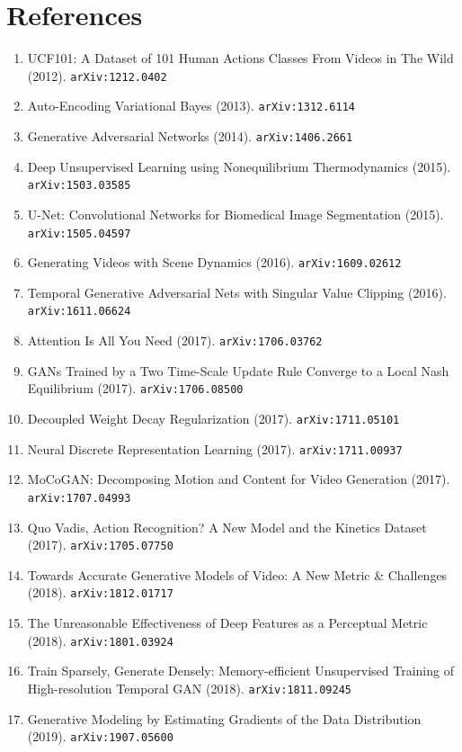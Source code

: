 \documentclass[11pt]{article}
\begin{document}
\section*{References}
\begin{enumerate}\small
  \item UCF101: A Dataset of 101 Human Actions Classes From Videos in The Wild (2012). \texttt{arXiv:1212.0402}
  \item Auto-Encoding Variational Bayes (2013). \texttt{arXiv:1312.6114}
  \item Generative Adversarial Networks (2014). \texttt{arXiv:1406.2661}
  \item Deep Unsupervised Learning using Nonequilibrium Thermodynamics (2015). \texttt{arXiv:1503.03585}
  \item U-Net: Convolutional Networks for Biomedical Image Segmentation (2015). \texttt{arXiv:1505.04597}
  \item Generating Videos with Scene Dynamics (2016). \texttt{arXiv:1609.02612}
  \item Temporal Generative Adversarial Nets with Singular Value Clipping (2016). \texttt{arXiv:1611.06624}
  \item Attention Is All You Need (2017). \texttt{arXiv:1706.03762}
  \item GANs Trained by a Two Time-Scale Update Rule Converge to a Local Nash
  Equilibrium (2017). \texttt{arXiv:1706.08500}
  \item Decoupled Weight Decay Regularization (2017). \texttt{arXiv:1711.05101}
  \item Neural Discrete Representation Learning (2017). \texttt{arXiv:1711.00937}
  \item MoCoGAN: Decomposing Motion and Content for Video Generation (2017). \texttt{arXiv:1707.04993}
  \item Quo Vadis, Action Recognition? A New Model and the Kinetics Dataset (2017). \texttt{arXiv:1705.07750}
  \item Towards Accurate Generative Models of Video: A New Metric \& Challenges (2018). \texttt{arXiv:1812.01717}
  \item The Unreasonable Effectiveness of Deep Features as a Perceptual Metric (2018). \texttt{arXiv:1801.03924}
  \item Train Sparsely, Generate Densely: Memory-efficient Unsupervised Training
  of High-resolution Temporal GAN (2018). \texttt{arXiv:1811.09245}
  \item Generative Modeling by Estimating Gradients of the Data Distribution (2019). \texttt{arXiv:1907.05600}

\end{enumerate}
\end{document}
